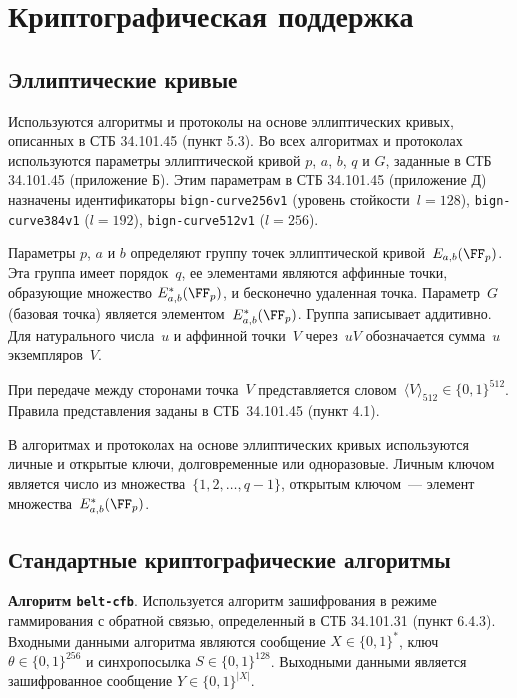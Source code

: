 \chapter{Криптографическая поддержка}\label{CRYPTO}

\section{Эллиптические кривые}

Используются алгоритмы и протоколы 
на основе эллиптических кривых, описанных в СТБ 34.101.45 (пункт 5.3). Во 
всех алгоритмах и протоколах используются параметры эллиптической кривой 
$p$, $a$, $b$, $q$ и $G$, заданные в СТБ 34.101.45 (приложение Б).
Этим параметрам в СТБ 34.101.45 (приложение Д) назначены идентификаторы
\texttt{bign-curve256v1} (уровень стойкости~$l=128$), 
\texttt{bign-curve384v1} ($l=192$), \texttt{bign-curve512v1} ($l=256$).

Параметры $p$, $a$ и $b$ определяют группу точек эллиптической
кривой~$E_{a,b}(\FF_p)$. Эта группа имеет порядок~$q$, ее элементами
являются аффинные точки, образующие множество $E_{a,b}^*(\FF_p)$, и
бесконечно удаленная точка. Параметр~$G$ (базовая точка) является
элементом~$E_{a,b}^*(\FF_p)$. Группа записывает аддитивно. Для натурального
числа~$u$ и аффинной точки~$V$ через~$uV$ обозначается сумма~$u$
экземпляров~$V$.

При передаче между сторонами точка~$V$ представляется 
словом~$\langle V\rangle_{512}\in\{0,1\}^{512}$. Правила представления заданы 
в СТБ~34.101.45 (пункт 4.1).

В алгоритмах и протоколах на основе эллиптических кривых используются 
личные и открытые ключи, долговременные или одноразовые. Личным ключом 
является число из множества~$\{1, 2,\ldots, q-1\}$, открытым ключом~--- 
элемент множества~$E_{a,b}^*(\FF_p)$.

\section{Стандартные криптографические алгоритмы}
\label{CRYPTO.StdAlg}


{\bf Алгоритм \texttt{belt-cfb}}.
Используется алгоритм зашифрования в режиме 
гаммирования с обратной связью, определенный в СТБ 34.101.31 (пункт 
6.4.3). Входными данными алгоритма являются сообщение $X\in\{0,1\}^*$, 
ключ $\theta\in\{0,1\}^{256}$ и синхропосылка $S\in\{0,1\}^{128}$.
Выходными данными является зашифрованное сообщение $Y\in\{0,1\}^{|X|}$.

